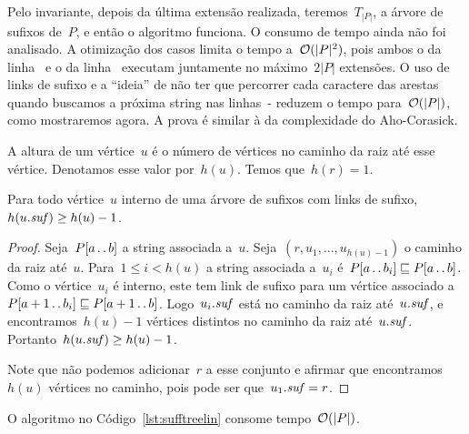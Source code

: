 
Pelo invariante, depois da última extensão realizada, teremos~$T_{|P|}$, a árvore de sufixos de~$P$, e então o algoritmo funciona. O consumo de tempo ainda não foi analisado. A otimização dos casos limita o tempo a~$\mathcal{O}(|P|^2)$, pois ambos o  da linha~ e o  da linha~ executam juntamente no máximo~$2|P|$ extensões. O uso de links de sufixo e a ``ideia'' de não ter que percorrer cada caractere das arestas quando buscamos a próxima string nas linhas~- reduzem o tempo para~$\mathcal{O}(|P|)$, como mostraremos agora. A prova é similar à da complexidade do Aho-Corasick.

\begin{definition}
A altura de um vértice~$u$ é o número de vértices no caminho da raiz até esse vértice. Denotamos esse valor por~$h(u)$. Temos que~$h(r) = 1$.
\end{definition}

\begin{lemma}
\label{lem:alturasuf}
Para todo vértice~$u$ interno de uma árvore de sufixos com links de sufixo,~$h(u.\mathit{suf}) \geq h(u) - 1$.
\end{lemma}

\begin{proof}
Seja~$P[a\,.\,.\, b]$ a string associada a~$u$. Seja~$(r, u_1, \ldots, u_{h(u)-1})$ o caminho da raiz até~$u$. Para~$1 \leq i < h(u)$ a string associada a~$u_i$ é~${P[a\,.\,.\, b_i] \sqsubseteq P[a\,.\,.\, b]}$. Como o vértice~$u_i$ é interno, este tem link de sufixo para um vértice associado a~${P[a+1\,.\,.\, b_i] \sqsubseteq P[a+1\,.\,.\, b]}$. Logo~$u_i.\mathit{suf}$ está no caminho da raiz até~$u.\mathit{suf}$, e encontramos~$h(u) - 1$ vértices distintos no caminho da raiz até~$u.\mathit{suf}$. Portanto~$h(u.\mathit{suf}) \geq h(u) - 1$.

Note que não podemos adicionar~$r$ a esse conjunto e afirmar que encontramos~$h(u)$ vértices no caminho, pois pode ser que~$u_1.\mathit{suf} = r$.
\end{proof}

\begin{complexity}
O algoritmo no Código~\ref{lst:sufftreelin} consome tempo~$\mathcal{O}(|P|)$.
\end{complexity}

